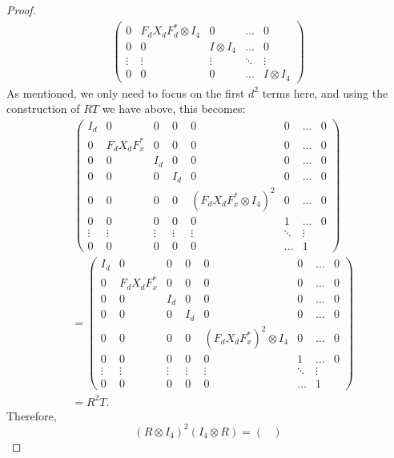 \documentclass{article}
\begin{document}
\begin{enumerate}
\begin{proof}
\begin{align*}
\begin{pmatrix}
            0 & F_dX_dF_d^*\otimes I_4 & 0 &\dots & 0\\
            0 & 0 & I\otimes I_4 & \dots & 0\\
            \vdots & \vdots &\vdots &\ddots & \vdots\\
            0 & 0 & 0 & \dots & I\otimes I_4
          \end{pmatrix}
        \end{align*}
        As mentioned, we only need to focus on the first $d^2$ terms here, and using the construction of $RT$ we have above, this becomes:
        \begin{align*}
          &\,\begin{pmatrix}
            I_d & 0 & 0 &0 & 0 & 0 & \dots & 0\\
            0 & F_dX_dF_x^* & 0 &0 & 0 & 0 & \dots & 0\\
            0 & 0 & I_d&0 & 0 & 0 & \dots & 0\\
            0 & 0 & 0 &I_d & 0 & 0 & \dots & 0\\
            0 & 0 & 0 &0 & (F_dX_dF_x^*\otimes I_4)^2 & 0 & \dots & 0\\
            0 & 0 & 0 &0 & 0 & 1 & \dots & 0\\
            \vdots & \vdots & \vdots & \vdots &\vdots & \ddots &\vdots\\
            0 & 0 & 0 & 0  & 0 & \dots & 1
          \end{pmatrix}\\
          &=\begin{pmatrix}
            I_d & 0 & 0 &0 & 0 & 0 & \dots & 0\\
            0 & F_dX_dF_x^* & 0 &0 & 0 & 0 & \dots & 0\\
            0 & 0 & I_d&0 & 0 & 0 & \dots & 0\\
            0 & 0 & 0 &I_d & 0 & 0 & \dots & 0\\
            0 & 0 & 0 &0 & (F_dX_dF_x^*)^2\otimes I_4 & 0 & \dots & 0\\
            0 & 0 & 0 &0 & 0 & 1 & \dots & 0\\
            \vdots & \vdots & \vdots & \vdots &\vdots & \ddots &\vdots\\
            0 & 0 & 0 & 0  & 0 & \dots & 1
          \end{pmatrix}\\
          &= R^2T.
        \end{align*}
        Therefore, \[(R\otimes I_4)^2(I_4\otimes R) = \begin{pmatrix}

\end{pmatrix}\]
\end{proof}
\end{enumerate}
\end{document}
